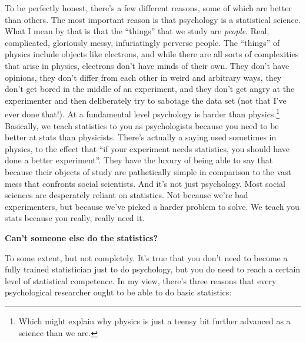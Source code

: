 \documentclass[
  letterpaper,
]{book}
\begin{document}
To be perfectly honest, there's a few different reasons, some of which
are better than others. The most important reason is that psychology is
a statistical science. What I mean by that is that the ``things'' that
we study are \emph{people}. Real, complicated, gloriously messy,
infuriatingly perverse people. The ``things'' of physics include objects
like electrons, and while there are all sorts of complexities that arise
in physics, electrons don't have minds of their own. They don't have
opinions, they don't differ from each other in weird and arbitrary ways,
they don't get bored in the middle of an experiment, and they don't get
angry at the experimenter and then deliberately try to sabotage the data
set (not that I've ever done that!). At a fundamental level psychology
is harder than physics.\footnote{Which might explain why physics is just
  a teensy bit further advanced as a science than we are.} Basically, we
teach statistics to you as psychologists because you need to be better
at stats than physicists. There's actually a saying used sometimes in
physics, to the effect that ``if your experiment needs statistics, you
should have done a better experiment''. They have the luxury of being
able to say that because their objects of study are pathetically simple
in comparison to the vast mess that confronts social scientists. And
it's not just psychology. Most social sciences are desperately reliant
on statistics. Not because we're bad experimenters, but because we've
picked a harder problem to solve. We teach you stats because you really,
really need it.

\textbf{Can't someone else do the statistics?}

To some extent, but not completely. It's true that you don't need to
become a fully trained statistician just to do psychology, but you do
need to reach a certain level of statistical competence. In my view,
there's three reasons that every psychological researcher ought to be
able to do basic statistics:
\end{document}
